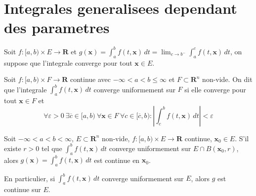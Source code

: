 \section{Integrales generalisees dependant des parametres}
Soit $f:[a,b)\times E\to \mathbf{R}$ et $g(\boldsymbol{x})=\int_{a}^{b} f(t,\boldsymbol{x}) \, dt=\lim_{ c \to b^{-} }\int_{a}^{c} f(t,\boldsymbol{x}) \, dt$, on suppose que l'integrale converge pour tout $\boldsymbol{x}\in E$.

\begin{definition}
Soit $f:[a,b)\times F\to \mathbf{R}$ continue avec $-\infty<a<b\leq\infty$ et $F\subset \mathbf{R}^{n}$ non-vide. On dit que l'integrale $\int_{a}^{b} f(t,\boldsymbol{x}) \, dt$ converge uniformement sur $F$ si elle converge pour tout $\boldsymbol{x}\in F$ et
$$
\forall\varepsilon>0 ~\exists  \overline{c}\in[a,b)~\forall \boldsymbol{x}\in F ~\forall c \in[\overline{c},b) : \left\lvert  \int_{c}^{b} f(t,\boldsymbol{x}) \, dt   \right\rvert <\varepsilon
$$

\end{definition}
\begin{theorem}
Soit $-\infty<a<b< \infty$, $E\subset \mathbf{R}^{n}$ non-vide, $f:[a,b)\times E\to \mathbf{R}$ continue, $\boldsymbol{x}_{0}\in E$. S'il existe $r>0$ tel que $\int_{a}^{b} f(t,\boldsymbol{x}) \, dt$ converge uniformement sur $E\cap B(\boldsymbol{x}_{0},r)$, alors $g(\boldsymbol{x})=\int_{a}^{b} f(t,\boldsymbol{x}) \, dt$ est continue en $\boldsymbol{x}_{0}$.

En particulier, si $\int_{a}^{b} f(t,\boldsymbol{x}) \, dt$ converge uniformement sur $E$, alors $g$ est continue sur $E$.
\end{theorem}
